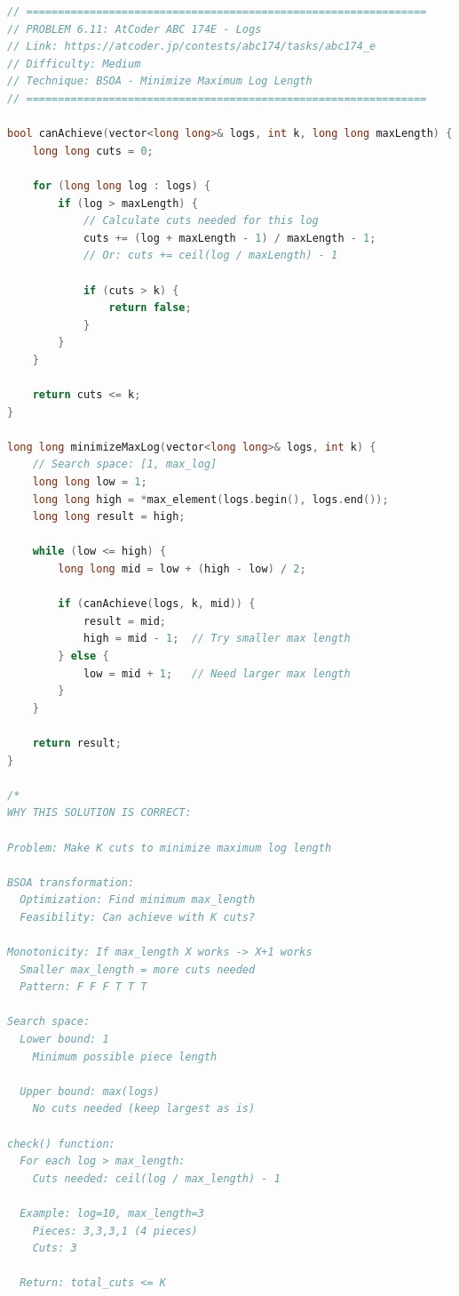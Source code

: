 \documentclass[11pt,a4paper,oneside]{book}
\begin{document}
\begin{lstlisting}[language=C++, caption=Complete BSOA Solutions - Minimize Maximum]
// ===============================================================
// PROBLEM 6.11: AtCoder ABC 174E - Logs
// Link: https://atcoder.jp/contests/abc174/tasks/abc174_e
// Difficulty: Medium
// Technique: BSOA - Minimize Maximum Log Length
// ===============================================================

bool canAchieve(vector<long long>& logs, int k, long long maxLength) {
    long long cuts = 0;
    
    for (long long log : logs) {
        if (log > maxLength) {
            // Calculate cuts needed for this log
            cuts += (log + maxLength - 1) / maxLength - 1;
            // Or: cuts += ceil(log / maxLength) - 1
            
            if (cuts > k) {
                return false;
            }
        }
    }
    
    return cuts <= k;
}

long long minimizeMaxLog(vector<long long>& logs, int k) {
    // Search space: [1, max_log]
    long long low = 1;
    long long high = *max_element(logs.begin(), logs.end());
    long long result = high;
    
    while (low <= high) {
        long long mid = low + (high - low) / 2;
        
        if (canAchieve(logs, k, mid)) {
            result = mid;
            high = mid - 1;  // Try smaller max length
        } else {
            low = mid + 1;   // Need larger max length
        }
    }
    
    return result;
}

/*
WHY THIS SOLUTION IS CORRECT:

Problem: Make K cuts to minimize maximum log length

BSOA transformation:
  Optimization: Find minimum max_length
  Feasibility: Can achieve with K cuts?

Monotonicity: If max_length X works -> X+1 works
  Smaller max_length = more cuts needed
  Pattern: F F F T T T

Search space:
  Lower bound: 1
    Minimum possible piece length
  
  Upper bound: max(logs)
    No cuts needed (keep largest as is)

check() function:
  For each log > max_length:
    Cuts needed: ceil(log / max_length) - 1
  
  Example: log=10, max_length=3
    Pieces: 3,3,3,1 (4 pieces)
    Cuts: 3
  
  Return: total_cuts <= K


\end{lstlisting}
\end{document}
